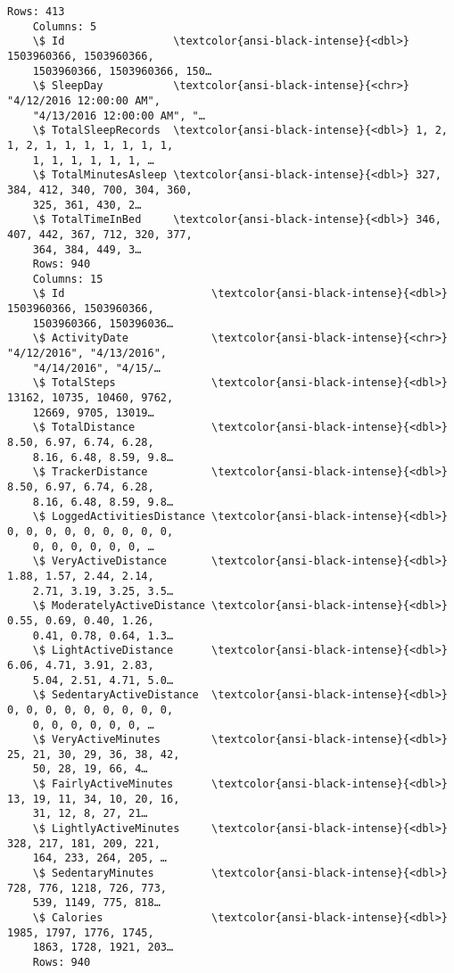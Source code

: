 \begin{Verbatim}[commandchars=\\\{\}]
    Rows: 413
    Columns: 5
    \$ Id                 \textcolor{ansi-black-intense}{<dbl>} 1503960366, 1503960366,
    1503960366, 1503960366, 150…
    \$ SleepDay           \textcolor{ansi-black-intense}{<chr>} "4/12/2016 12:00:00 AM",
    "4/13/2016 12:00:00 AM", "…
    \$ TotalSleepRecords  \textcolor{ansi-black-intense}{<dbl>} 1, 2, 1, 2, 1, 1, 1, 1, 1, 1, 1,
    1, 1, 1, 1, 1, 1, …
    \$ TotalMinutesAsleep \textcolor{ansi-black-intense}{<dbl>} 327, 384, 412, 340, 700, 304, 360,
    325, 361, 430, 2…
    \$ TotalTimeInBed     \textcolor{ansi-black-intense}{<dbl>} 346, 407, 442, 367, 712, 320, 377,
    364, 384, 449, 3…
    Rows: 940
    Columns: 15
    \$ Id                       \textcolor{ansi-black-intense}{<dbl>} 1503960366, 1503960366,
    1503960366, 150396036…
    \$ ActivityDate             \textcolor{ansi-black-intense}{<chr>} "4/12/2016", "4/13/2016",
    "4/14/2016", "4/15/…
    \$ TotalSteps               \textcolor{ansi-black-intense}{<dbl>} 13162, 10735, 10460, 9762,
    12669, 9705, 13019…
    \$ TotalDistance            \textcolor{ansi-black-intense}{<dbl>} 8.50, 6.97, 6.74, 6.28,
    8.16, 6.48, 8.59, 9.8…
    \$ TrackerDistance          \textcolor{ansi-black-intense}{<dbl>} 8.50, 6.97, 6.74, 6.28,
    8.16, 6.48, 8.59, 9.8…
    \$ LoggedActivitiesDistance \textcolor{ansi-black-intense}{<dbl>} 0, 0, 0, 0, 0, 0, 0, 0, 0,
    0, 0, 0, 0, 0, 0, …
    \$ VeryActiveDistance       \textcolor{ansi-black-intense}{<dbl>} 1.88, 1.57, 2.44, 2.14,
    2.71, 3.19, 3.25, 3.5…
    \$ ModeratelyActiveDistance \textcolor{ansi-black-intense}{<dbl>} 0.55, 0.69, 0.40, 1.26,
    0.41, 0.78, 0.64, 1.3…
    \$ LightActiveDistance      \textcolor{ansi-black-intense}{<dbl>} 6.06, 4.71, 3.91, 2.83,
    5.04, 2.51, 4.71, 5.0…
    \$ SedentaryActiveDistance  \textcolor{ansi-black-intense}{<dbl>} 0, 0, 0, 0, 0, 0, 0, 0, 0,
    0, 0, 0, 0, 0, 0, …
    \$ VeryActiveMinutes        \textcolor{ansi-black-intense}{<dbl>} 25, 21, 30, 29, 36, 38, 42,
    50, 28, 19, 66, 4…
    \$ FairlyActiveMinutes      \textcolor{ansi-black-intense}{<dbl>} 13, 19, 11, 34, 10, 20, 16,
    31, 12, 8, 27, 21…
    \$ LightlyActiveMinutes     \textcolor{ansi-black-intense}{<dbl>} 328, 217, 181, 209, 221,
    164, 233, 264, 205, …
    \$ SedentaryMinutes         \textcolor{ansi-black-intense}{<dbl>} 728, 776, 1218, 726, 773,
    539, 1149, 775, 818…
    \$ Calories                 \textcolor{ansi-black-intense}{<dbl>} 1985, 1797, 1776, 1745,
    1863, 1728, 1921, 203…
    Rows: 940

\end{Verbatim}
